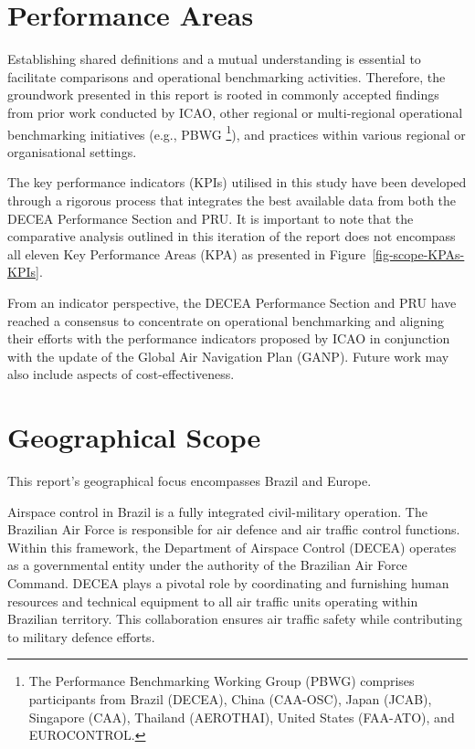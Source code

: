 \documentclass[
  a4paper,
  DIV=11,
  numbers=noendperiod]{scrreport}
\begin{document}
\hypertarget{performance-areas}{%
\section{Performance Areas}\label{performance-areas}}

Establishing shared definitions and a mutual understanding is essential
to facilitate comparisons and operational benchmarking activities.
Therefore, the groundwork presented in this report is rooted in commonly
accepted findings from prior work conducted by ICAO, other regional or
multi-regional operational benchmarking initiatives (e.g., PBWG
\footnote{The Performance Benchmarking Working Group (PBWG) comprises
  participants from Brazil (DECEA), China (CAA-OSC), Japan (JCAB),
  Singapore (CAA), Thailand (AEROTHAI), United States (FAA-ATO), and
  EUROCONTROL.}), and practices within various regional or
organisational settings.

The key performance indicators (KPIs) utilised in this study have been
developed through a rigorous process that integrates the best available
data from both the DECEA Performance Section and PRU. It is important to
note that the comparative analysis outlined in this iteration of the
report does not encompass all eleven Key Performance Areas (KPA) as
presented in Figure~\ref{fig-scope-KPAs-KPIs}.

From an indicator perspective, the DECEA Performance Section and PRU
have reached a consensus to concentrate on operational benchmarking and
aligning their efforts with the performance indicators proposed by ICAO
in conjunction with the update of the Global Air Navigation Plan (GANP).
Future work may also include aspects of cost-effectiveness.

\hypertarget{geographical-scope}{%
\section{Geographical Scope}\label{geographical-scope}}

This report's geographical focus encompasses Brazil and Europe.

Airspace control in Brazil is a fully integrated civil-military
operation. The Brazilian Air Force is responsible for air defence and
air traffic control functions. Within this framework, the Department of
Airspace Control (DECEA) operates as a governmental entity under the
authority of the Brazilian Air Force Command. DECEA plays a pivotal role
by coordinating and furnishing human resources and technical equipment
to all air traffic units operating within Brazilian territory. This
collaboration ensures air traffic safety while contributing to military
defence efforts.
\end{document}
